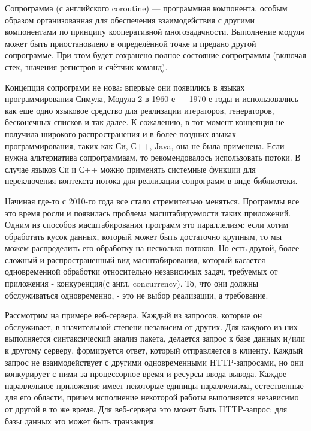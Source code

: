 
	Сопрограмма (с английского coroutine) — программная компонента, особым образом организованная для обеспечения взаимодействия с другими компонентами по принципу кооперативной многозадачности. Выполнение модуля может быть приостановлено в определённой точке и предано другой сопрограмме. При этом будет сохранено полное состояние сопрограммы (включая стек, значения регистров и счётчик команд).
	\par
	Концепция сопрограмм не нова: впервые они появились в языках программирования Симула,
	Модула-2 в 1960-е — 1970-е годы и использовались как еще одно языковое средство для
	реализации итераторов, генераторов, бесконечных списков и так далее. К сожалению, в
	тот момент концепция не получила широкого распространения и в более поздних языках
	программирования, таких как Си, С++, Java, она не была применена. Если нужна
	альтернатива сопрограммаам, то рекомендовалось использовать потоки. В случае языков Си и С++ можно применять 
	системные функции для переключения контекста потока для реализации сопрограмм в виде библиотеки.
	\par
	Начиная где-то с 2010-го года все стало стремительно меняться. Программы все это время
	росли и появилась проблема масштабируемости таких приложений. Одним из способов
	масштабирования программ это параллелизм: если хотим обработать кусок данных, который
	может быть достаточно крупным, то мы можем распределить его обработку на несколько потоков. Но есть
	другой, более сложный и распространенный вид масштабирования, который касается одновременной
	обработки относительно независимых задач, требуемых от приложения - конкуренция(с англ.
	concurrency). То, что они должны обслуживаться одновременно, - это не выбор реализации, а требование.
	
	\par
	Рассмотрим на примере веб-сервера. Каждый из запросов, которые он обслуживает, в значительной степени
	независим от других. Для каждого из них выполняется синтаксический анализ пакета, делается запрос к базе данных и/или к другому серверу, формируется ответ, который
	отправляется в клиенту. Каждый запрос не взаимодействует с другими одновременными
	HTTP-запросами, но они конкурирует с ними за процессорное время и ресурсы ввода-вывода.
	Каждое параллельное приложение имеет 
	некоторые единицы параллелизма, естественные для его области, причем исполнение 
	некоторой работы выполняется независимо от другой в то же время. Для 
	веб-сервера это может быть HTTP-запрос; для базы данных это может быть транзакция.
	
